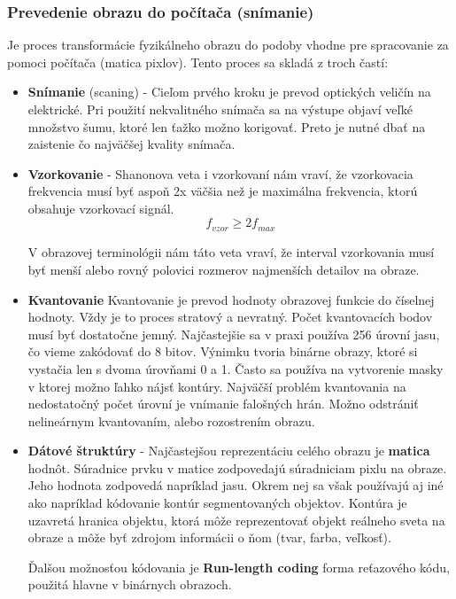 \subsubsection{Prevedenie obrazu do počítača (snímanie)}
Je proces transformácie fyzikálneho obrazu do podoby vhodne pre spracovanie za pomoci počítača (matica pixlov). Tento proces sa skladá z troch častí: 
\begin{itemize}
\item \textbf{Snímanie} (scaning) - Cieľom prvého kroku je prevod optických veličín na elektrické. Pri použití nekvalitného snímača sa na výstupe objaví veľké množstvo šumu, ktoré len ťažko možno korigovať. Preto je nutné dbať na zaistenie čo najväčšej kvality snímača. 

\item \textbf{Vzorkovanie} - Shanonova veta i vzorkovaní nám vraví, že vzorkovacia frekvencia musí byť aspoň 2x väčšia než je maximálna frekvencia, ktorú obsahuje vzorkovací signál.
$$\textit{f}_{\textit{vzor}} \ge {2} \textit{f}_{\textit{max}}$$

V obrazovej terminológii nám táto veta vraví, že interval vzorkovania musí byť menší alebo rovný polovici rozmerov najmenších detailov na obraze. 

\item \textbf{Kvantovanie} 
Kvantovanie je prevod hodnoty obrazovej funkcie do číselnej hodnoty. Vždy je to proces stratový a nevratný. Počet kvantovacích bodov musí byť dostatočne jemný. Najčastejšie sa v praxi používa 256 úrovní jasu, čo vieme zakódovať do 8 bitov. Výnimku tvoria binárne obrazy, ktoré si vystačia len s dvoma úrovňami 0 a 1. Často sa používa na vytvorenie masky v ktorej možno ľahko nájsť kontúry. Najväčší problém kvantovania na nedostatočný počet úrovní je vnímanie falošných hrán. Možno odstrániť nelineárnym kvantovaním, alebo rozostrením obrazu. 



\item \textbf{Dátové štruktúry} - Najčastejšou reprezentáciu celého obrazu je \textbf{matica} hodnôt. Súradnice prvku v matice zodpovedajú súradniciam pixlu na obraze. Jeho hodnota zodpovedá napríklad jasu.  Okrem nej sa však používajú aj iné ako napríklad kódovanie kontúr segmentovaných objektov. Kontúra je uzavretá hranica objektu, ktorá môže reprezentovať objekt reálneho sveta na obraze a môže byť zdrojom informácii o ňom (tvar, farba, veľkosť).

Ďalšou možnosťou kódovania je \textbf{Run-length coding} forma reťazového kódu, použitá hlavne v binárnych obrazoch. 


\end{itemize}
